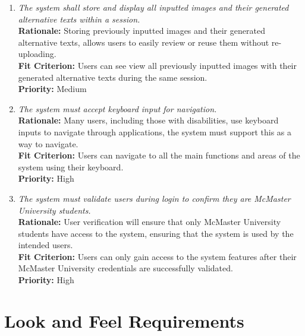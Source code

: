 \documentclass[12pt]{article}
\begin{document}
\begin{enumerate}[label=FR \arabic*., wide=0pt, leftmargin=*]
    {\bf Fit Criterion:} Users can add or delete text in any part of the outputted alternative text and save their changes.\\
    {\bf Priority:} High
  \item \emph{The system shall store and display all inputted images and their generated alternative texts within a session.}\\[2mm] 
    {\bf Rationale:} Storing previously inputted images and their generated alternative texts, allows users to easily review or reuse them without re-uploading. \\
    {\bf Fit Criterion:} Users can see view all previously inputted images with their generated alternative texts during the same session. \\
    {\bf Priority:} Medium
  \item \emph{The system must accept keyboard input for navigation.}\\[2mm] 
    {\bf Rationale:} Many users, including those with disabilities, use keyboard inputs to navigate through applications, the system must support this as a way to navigate.\\
    {\bf Fit Criterion:} Users can navigate to all the main functions and areas of the system using their keyboard. \\
    {\bf Priority:} High
 \item \emph{The system must validate users during login to confirm they are McMaster University students.}\\[2mm] 
    {\bf Rationale:} User verification will ensure that only McMaster University students have access to the system, ensuring that the system is used by the intended users.  \\
    {\bf Fit Criterion:} Users can only gain access to the system features after their McMaster University credentials are successfully validated.  \\
    {\bf Priority:} High
\end{enumerate}

\section{Look and Feel Requirements}
\end{document}
